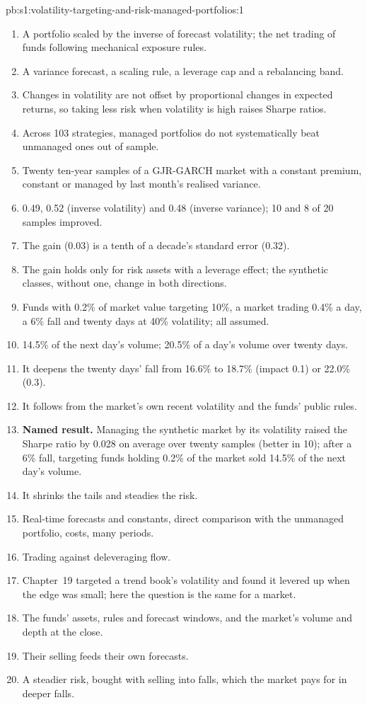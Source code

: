 \begin{solution}{pb:s1:volatility-targeting-and-risk-managed-portfolios:1}
\begin{enumerate}
\item A portfolio scaled by the inverse of forecast volatility; the net trading of funds following mechanical exposure rules.
\item A variance forecast, a scaling rule, a leverage cap and a rebalancing band.
\item Changes in volatility are not offset by proportional changes in expected returns, so taking less risk when volatility is high raises Sharpe ratios.
\item Across 103 strategies, managed portfolios do not systematically beat unmanaged ones out of sample.
\item Twenty ten-year samples of a GJR-GARCH market with a constant premium, constant or managed by last month's realised variance.
\item 0.49, 0.52 (inverse volatility) and 0.48 (inverse variance); 10 and 8 of 20 samples improved.
\item The gain (0.03) is a tenth of a decade's standard error (0.32).
\item The gain holds only for risk assets with a leverage effect; the synthetic classes, without one, change in both directions.
\item Funds with 0.2\% of market value targeting 10\%, a market trading 0.4\% a day, a 6\% fall and twenty days at 40\% volatility; all assumed.
\item 14.5\% of the next day's volume; 20.5\% of a day's volume over twenty days.
\item It deepens the twenty days' fall from 16.6\% to 18.7\% (impact 0.1) or 22.0\% (0.3).
\item It follows from the market's own recent volatility and the funds' public rules.
\item \textbf{Named result.} Managing the synthetic market by its volatility raised the Sharpe ratio by 0.028 on average over twenty samples (better in
10); after a 6\% fall, targeting funds holding 0.2\% of the market sold 14.5\% of the next day's volume.
\item It shrinks the tails and steadies the risk.
\item Real-time forecasts and constants, direct comparison with the unmanaged portfolio, costs, many periods.
\item Trading against deleveraging flow.
\item Chapter~19 targeted a trend book's volatility and found it levered up when the edge was small; here the question is the same for a market.
\item The funds' assets, rules and forecast windows, and the market's volume and depth at the close.
\item Their selling feeds their own forecasts.
\item A steadier risk, bought with selling into falls, which the market pays for in deeper falls.
\end{enumerate}
\end{solution}

